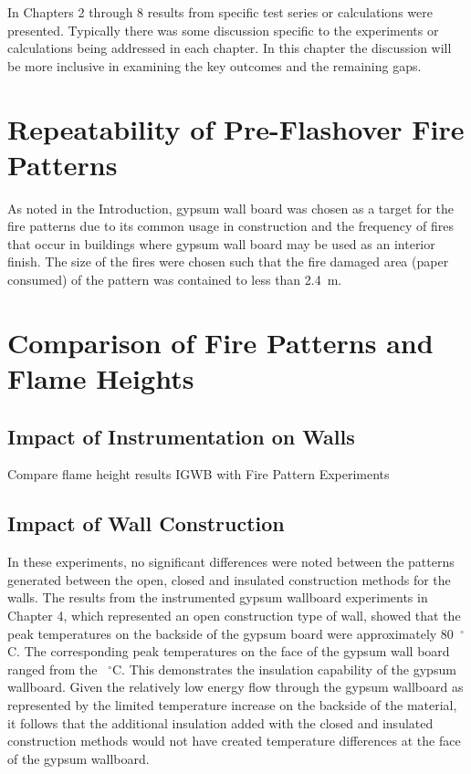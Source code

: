 \documentclass[twoside]{uocthesis}
\begin{document}
{In Chapters 2 through 8 results from specific test series or calculations were presented.  Typically there was some discussion specific to the experiments or calculations being addressed in each chapter.  In this chapter the discussion will be more inclusive in examining the key outcomes and the remaining gaps.   

\section{Repeatability of Pre-Flashover Fire Patterns}

As noted in the Introduction, gypsum wall board was chosen as a target for the fire patterns due to its common usage in construction and the frequency of fires that occur in buildings where gypsum wall board may be used as an interior finish. The size of the fires were chosen such that the fire damaged area (paper consumed) of the pattern was contained to less than 2.4~m.  



\section{Comparison of Fire Patterns and Flame Heights}

\subsection{Impact of Instrumentation on Walls}

Compare flame height results IGWB with Fire Pattern Experiments

\subsection{Impact of Wall Construction}

In these experiments, no significant differences were noted between the patterns generated between the open, closed and insulated construction methods for the walls.  The results from the instrumented gypsum wallboard experiments in Chapter 4, which represented an open construction type of wall, showed that the peak temperatures on the backside of the gypsum board were approximately 80~$^\circ$C.  The corresponding peak temperatures on the face of the gypsum wall board ranged from the    ~$^\circ$C.  This demonstrates the insulation capability of the gypsum wallboard. Given the relatively low energy flow through the gypsum wallboard as represented by the limited temperature increase on the backside of the material, it follows that the additional insulation added with the closed and insulated construction methods would not have created temperature differences at the face of the gypsum wallboard.  

}
\end{document}
